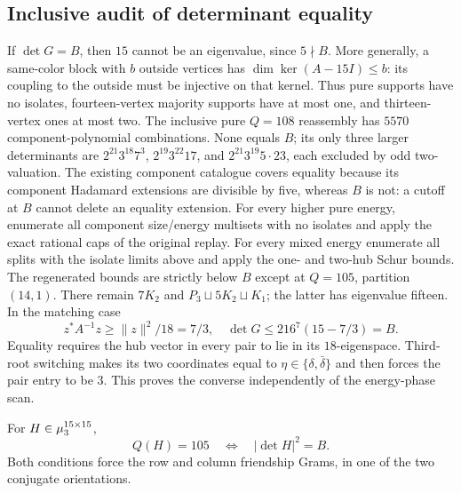 \subsection{Inclusive audit of determinant equality}\label{sec:inclusive-new}
If $\det G=B$, then $15$ cannot be an eigenvalue, since $5\nmid B$. More generally, a same-color block with $b$ outside vertices has $\dim\ker(A-15I)\le b$: its coupling to the outside must be injective on that kernel. Thus pure supports have no isolates, fourteen-vertex majority supports have at most one, and thirteen-vertex ones at most two.
The inclusive pure $Q=108$ reassembly has $5570$ component-polynomial combinations. None equals $B$; its only three larger determinants are $2^{21}3^{18}7^3$, $2^{19}3^{22}17$, and $2^{21}3^{19}5\cdot23$, each excluded by odd two-valuation. The existing component catalogue covers equality because its component Hadamard extensions are divisible by five, whereas $B$ is not: a cutoff at $B$ cannot delete an equality extension.
For every higher pure energy, enumerate all component size/energy multisets with no isolates and apply the exact rational caps of the original replay. For every mixed energy enumerate all splits with the isolate limits above and apply the one- and two-hub Schur bounds. The regenerated bounds are strictly below $B$ except at $Q=105$, partition $(14,1)$. There remain $7K_2$ and $P_3\sqcup5K_2\sqcup K_1$; the latter has eigenvalue fifteen. In the matching case
\[z^*A^{-1}z\ge\|z\|^2/18=7/3,\quad \det G\le216^7(15-7/3)=B.\]
Equality requires the hub vector in every pair to lie in its $18$-eigenspace. Third-root switching makes its two coordinates equal to $\eta\in\{\delta,\bar\delta\}$ and then forces the pair entry to be $3$. This proves the converse independently of the energy-phase scan.
\begin{theorem}\label{thm:min-equivalence-new}
For $H\in\mu_3^{15\times15}$,
\[Q(H)=105\quad\Longleftrightarrow\quad |\det H|^2=B.\]
Both conditions force the row and column friendship Grams, in one of the two conjugate orientations.
\end{theorem}
